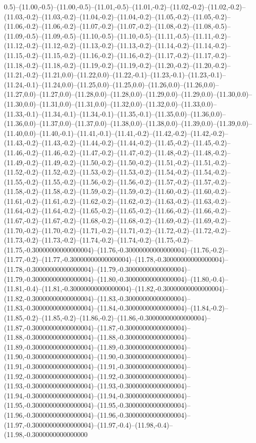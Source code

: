 0.5)--(11.00,-0.5)--(11.00,-0.5)--(11.01,-0.5)--(11.01,-0.2)--(11.02,-0.2)--(11.02,-0.2)--(11.03,-0.2)--(11.03,-0.2)--(11.04,-0.2)--(11.04,-0.2)--(11.05,-0.2)--(11.05,-0.2)--(11.06,-0.2)--(11.06,-0.2)--(11.07,-0.2)--(11.07,-0.2)--(11.08,-0.2)--(11.08,-0.5)--(11.09,-0.5)--(11.09,-0.5)--(11.10,-0.5)--(11.10,-0.5)--(11.11,-0.5)--(11.11,-0.2)--(11.12,-0.2)--(11.12,-0.2)--(11.13,-0.2)--(11.13,-0.2)--(11.14,-0.2)--(11.14,-0.2)--(11.15,-0.2)--(11.15,-0.2)--(11.16,-0.2)--(11.16,-0.2)--(11.17,-0.2)--(11.17,-0.2)--(11.18,-0.2)--(11.18,-0.2)--(11.19,-0.2)--(11.19,-0.2)--(11.20,-0.2)--(11.20,-0.2)--(11.21,-0.2)--(11.21,0.0)--(11.22,0.0)--(11.22,-0.1)--(11.23,-0.1)--(11.23,-0.1)--(11.24,-0.1)--(11.24,0.0)--(11.25,0.0)--(11.25,0.0)--(11.26,0.0)--(11.26,0.0)--(11.27,0.0)--(11.27,0.0)--(11.28,0.0)--(11.28,0.0)--(11.29,0.0)--(11.29,0.0)--(11.30,0.0)--(11.30,0.0)--(11.31,0.0)--(11.31,0.0)--(11.32,0.0)--(11.32,0.0)--(11.33,0.0)--(11.33,-0.1)--(11.34,-0.1)--(11.34,-0.1)--(11.35,-0.1)--(11.35,0.0)--(11.36,0.0)--(11.36,0.0)--(11.37,0.0)--(11.37,0.0)--(11.38,0.0)--(11.38,0.0)--(11.39,0.0)--(11.39,0.0)--(11.40,0.0)--(11.40,-0.1)--(11.41,-0.1)--(11.41,-0.2)--(11.42,-0.2)--(11.42,-0.2)--(11.43,-0.2)--(11.43,-0.2)--(11.44,-0.2)--(11.44,-0.2)--(11.45,-0.2)--(11.45,-0.2)--(11.46,-0.2)--(11.46,-0.2)--(11.47,-0.2)--(11.47,-0.2)--(11.48,-0.2)--(11.48,-0.2)--(11.49,-0.2)--(11.49,-0.2)--(11.50,-0.2)--(11.50,-0.2)--(11.51,-0.2)--(11.51,-0.2)--(11.52,-0.2)--(11.52,-0.2)--(11.53,-0.2)--(11.53,-0.2)--(11.54,-0.2)--(11.54,-0.2)--(11.55,-0.2)--(11.55,-0.2)--(11.56,-0.2)--(11.56,-0.2)--(11.57,-0.2)--(11.57,-0.2)--(11.58,-0.2)--(11.58,-0.2)--(11.59,-0.2)--(11.59,-0.2)--(11.60,-0.2)--(11.60,-0.2)--(11.61,-0.2)--(11.61,-0.2)--(11.62,-0.2)--(11.62,-0.2)--(11.63,-0.2)--(11.63,-0.2)--(11.64,-0.2)--(11.64,-0.2)--(11.65,-0.2)--(11.65,-0.2)--(11.66,-0.2)--(11.66,-0.2)--(11.67,-0.2)--(11.67,-0.2)--(11.68,-0.2)--(11.68,-0.2)--(11.69,-0.2)--(11.69,-0.2)--(11.70,-0.2)--(11.70,-0.2)--(11.71,-0.2)--(11.71,-0.2)--(11.72,-0.2)--(11.72,-0.2)--(11.73,-0.2)--(11.73,-0.2)--(11.74,-0.2)--(11.74,-0.2)--(11.75,-0.2)--(11.75,-0.30000000000000004)--(11.76,-0.30000000000000004)--(11.76,-0.2)--(11.77,-0.2)--(11.77,-0.30000000000000004)--(11.78,-0.30000000000000004)--(11.78,-0.30000000000000004)--(11.79,-0.30000000000000004)--(11.79,-0.30000000000000004)--(11.80,-0.30000000000000004)--(11.80,-0.4)--(11.81,-0.4)--(11.81,-0.30000000000000004)--(11.82,-0.30000000000000004)--(11.82,-0.30000000000000004)--(11.83,-0.30000000000000004)--(11.83,-0.30000000000000004)--(11.84,-0.30000000000000004)--(11.84,-0.2)--(11.85,-0.2)--(11.85,-0.2)--(11.86,-0.2)--(11.86,-0.30000000000000004)--(11.87,-0.30000000000000004)--(11.87,-0.30000000000000004)--(11.88,-0.30000000000000004)--(11.88,-0.30000000000000004)--(11.89,-0.30000000000000004)--(11.89,-0.30000000000000004)--(11.90,-0.30000000000000004)--(11.90,-0.30000000000000004)--(11.91,-0.30000000000000004)--(11.91,-0.30000000000000004)--(11.92,-0.30000000000000004)--(11.92,-0.30000000000000004)--(11.93,-0.30000000000000004)--(11.93,-0.30000000000000004)--(11.94,-0.30000000000000004)--(11.94,-0.30000000000000004)--(11.95,-0.30000000000000004)--(11.95,-0.30000000000000004)--(11.96,-0.30000000000000004)--(11.96,-0.30000000000000004)--(11.97,-0.30000000000000004)--(11.97,-0.4)--(11.98,-0.4)--(11.98,-0.3000000000000000